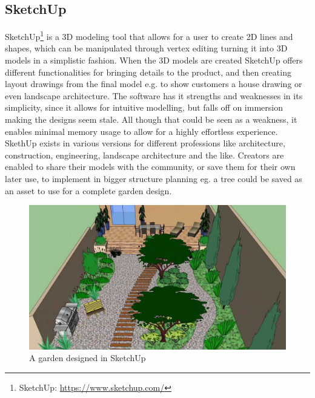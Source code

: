 		
		\subsection{SketchUp}
			SketchUp\footnote{SketchUp: \url{https://www.sketchup.com/}} is a 3D modeling tool that allows for a user to create 2D lines and shapes, which can be manipulated through vertex editing turning it into 3D models in a simplistic fashion. When the 3D models are created SketchUp offers different functionalities for bringing details to the product, and then creating layout drawings from the final	model e.g. to show customers a house drawing or even landscape architecture. The software has it strengths and weaknesses in its simplicity, since it allows for intuitive modelling, but falls off on immersion making the designs seem stale. All though that could be seen as a weakness, it enables minimal memory usage to allow for a highly effortless experience. \\
			
			SkethUp exists in various versions for different professions like architecture, construction, engineering, landscape architecture and the like. Creators are enabled to share their models with the community, or save them for their own later use, to implement in bigger structure planning eg. a tree could be saved as an asset to use for a complete garden design.
				\begin{figure}[H]
					\centering
					\includegraphics[width=0.6\linewidth]{figure/Analysis/sketchupgarden}
					\caption{A garden designed in SketchUp}
					\label{fig:sketchupgarden}
				\end{figure}